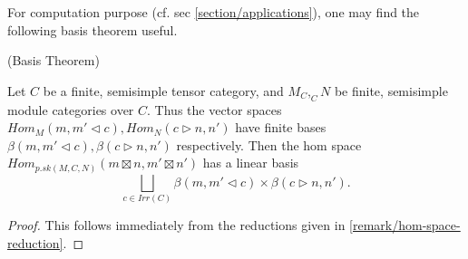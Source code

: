 \noindent For computation purpose (cf. sec \ref{section/applications}), one
may find the following basis theorem useful.

\begin{proposition} (Basis Theorem) \label{proposition/basis-theorem}

  \noindent Let $C$ be a finite, semisimple tensor category, and
  $M_{C}, _{C}N$ be finite, semisimple module categories over $C$. \quad Thus
  the vector spaces $Hom_{M}(m, m' \lhd c), Hom_{N}(c \rhd n, n')$ have finite bases
  $\beta(m, m' \lhd c), \beta(c \rhd n, n')$ respectively. \quad Then the hom space
  $Hom_{p.sk(M,C,N)}(m \boxtimes n, m' \boxtimes n')$ has a linear basis
  \[
    \bigsqcup_{c \in Irr(C)} \beta(m, m' \lhd c) \times \beta(c \rhd n, n').
  \]
\end{proposition}
\begin{proof}
  This follows immediately from the reductions given in \ref{remark/hom-space-reduction}.
\end{proof}
